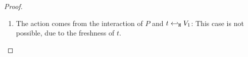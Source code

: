 \begin{proof}
\begin{enumerate}[1.]
\begin{enumerate}
							{\hwb}
							{\Delta_2''}{}
							{proof:trig_equiv33}
							The freshness of $t$ allows us to mimic the transitions
							in \eqref{proof:trig_equiv22} to get that for $\Delta_4$
							\begin{eqnarray*}
								\begin{array}{crll}
									& \Gamma; \es; \Delta_2' & \proves &		
									\newsp{\widetilde{m_2}}{Q \Par \ftrigger{t}{V_2}{U}}
									\\
									\Hby{} &&&
									\newsp{\widetilde{m_2}}{Q_2 \Par \ftrigger{t}{V_2}{U}}
									\\
									{\hby{\bactinp{t}{m}}}& & &
									\newsp{\widetilde{m_2}}{Q_2 \Par \newsp{s}{\binp{s}{y} \mapchar{U}{y} \Par \bout{\dual{s}}{V_2} \inact}}
									\\
									\Hby{} & \Delta_4 & \proves & Q'
								\end{array}
							\end{eqnarray*}
							The conclusion is immediate from \eqref{proof:trig_equiv33}.


				\item The action comes from the interaction of $P$ and $t \hookleftarrow_{\mathtt{H}} V_1$: This case is not possible, due to the freshness of $t$.
				\end{enumerate}



\end{enumerate}
\end{proof}
